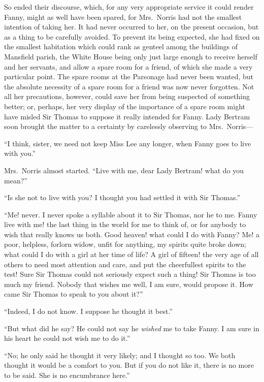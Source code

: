 \documentclass{article}
\begin{document}
So ended their discourse, which, for any very appropriate
service it could render Fanny, might as well have been spared,
for Mrs.\ Norris had not the smallest intention of taking her.
It had never occurred to her, on the present occasion,
but as a thing to be carefully avoided.  To prevent its
being expected, she had fixed on the smallest habitation
which could rank as genteel among the buildings of Mansfield
parish, the White House being only just large enough to
receive herself and her servants, and allow a spare room
for a friend, of which she made a very particular point.
The spare rooms at the Parsonage had never been wanted,
but the absolute necessity of a spare room for a friend
was now never forgotten.  Not all her precautions, however,
could save her from being suspected of something better;
or, perhaps, her very display of the importance of a
spare room might have misled Sir Thomas to suppose it
really intended for Fanny.  Lady Bertram soon brought
the matter to a certainty by carelessly observing to Mrs.\ Norris---%

``I think, sister, we need not keep Miss Lee any longer,
when Fanny goes to live with you.''

Mrs.\ Norris almost started.  ``Live with me, dear Lady
Bertram! what do you mean?''

``Is she not to live with you?  I thought you had settled
it with Sir Thomas.''

``Me! never.  I never spoke a syllable about it to Sir Thomas,
nor he to me.  Fanny live with me! the last thing in the
world for me to think of, or for anybody to wish that really
knows us both.  Good heaven! what could I do with Fanny?
Me! a poor, helpless, forlorn widow, unfit for anything,
my spirits quite broke down; what could I do with a girl
at her time of life?  A girl of fifteen! the very age
of all others to need most attention and care, and put
the cheerfullest spirits to the test!  Sure Sir Thomas
could not seriously expect such a thing!  Sir Thomas is too
much my friend.  Nobody that wishes me well, I am sure,
would propose it.  How came Sir Thomas to speak to you
about it?''

``Indeed, I do not know.  I suppose he thought it best.''

``But what did he say?  He could not say he \emph{wished} me
to take Fanny.  I am sure in his heart he could not wish
me to do it.''

``No; he only said he thought it very likely; and I thought
so too.  We both thought it would be a comfort to you.
But if you do not like it, there is no more to be said.
She is no encumbrance here.''
\end{document}
